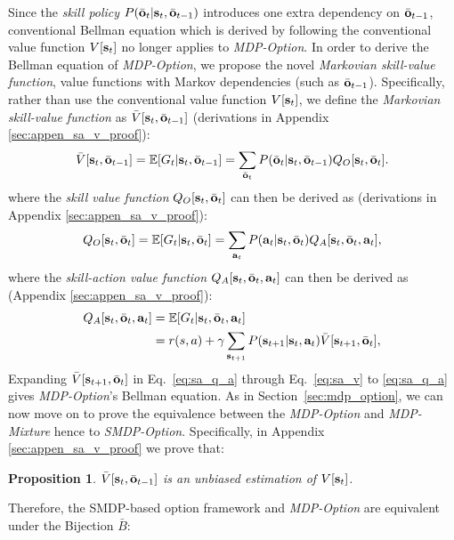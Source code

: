 \documentclass{article}
\newtheorem{prop}[thm]{Proposition}
\begin{document}
Since the \emph{skill policy}
$P(\bar{{\mathbf{o}}}_t|{\mathbf{s}}_t,\bar{{\mathbf{o}}}_{t-1})$ introduces one extra
dependency on $\bar{{\mathbf{o}}}_{t-1}$, conventional Bellman equation
which is derived by following the conventional value function
$V[{\mathbf{s}}_t]$ no longer applies to \emph{MDP-Option}. In order to derive
the Bellman equation of \emph{MDP-Option}, we propose the novel
\emph{Markovian skill-value function}, value functions with Markov
dependencies (such as $\bar{{\mathbf{o}}}_{t-1}$). Specifically, rather
than use the conventional value function $V[{\mathbf{s}}_t]$, we define
the \emph{Markovian skill-value function} as
$\bar{V}[{\mathbf{s}}_t,\bar{{\mathbf{o}}}_{t-1}]$ (derivations in Appendix
\ref{sec:appen_sa_v_proof}):
\begin{equation}
  \label{eq:sa_v}
  \bar{V}[{\mathbf{s}}_t,\bar{{\mathbf{o}}}_{t-1}]=\mathbb{E}[G_t|{\mathbf{s}}_t,\bar{{\mathbf{o}}}_{t-1}]= \sum_{\bar{{\mathbf{o}}}_t}P(\bar{{\mathbf{o}}}_t|{\mathbf{s}}_t,\bar{{\mathbf{o}}}_{t-1})Q_O[ {\mathbf{s}}_t,\bar{{\mathbf{o}}}_t].
\end{equation}
where the \emph{skill value function}
$Q_O[{\mathbf{s}}_t,\bar{{\mathbf{o}}}_{t}]$ can then be derived as (derivations
in Appendix \ref{sec:appen_sa_v_proof}):
\begin{align}
  Q_O[{\mathbf{s}}_t,\bar{{\mathbf{o}}}_{t}]=\mathbb{E}[G_t|{\mathbf{s}}_t,\bar{{\mathbf{o}}}_{t}]
  \label{eq:sa_q_o}=\sum_{{\mathbf{a}}_t}P({\mathbf{a}}_t|{\mathbf{s}}_t,\bar{{\mathbf{o}}}_{t})Q_A[ {\mathbf{s}}_t,\bar{{\mathbf{o}}}_t,{\mathbf{a}}_t],
\end{align}
where the \emph{skill-action value function} $Q_A[
{\mathbf{s}}_t,\bar{{\mathbf{o}}}_t,{\mathbf{a}}_t]$ can then be derived as (Appendix
\ref{sec:appen_sa_v_proof}):
\begin{align}
\label{eq:sa_q_a}
  Q_A[ {\mathbf{s}}_t,\bar{{\mathbf{o}}}_t,{\mathbf{a}}_t]&=\mathbb{E}[G_t| {\mathbf{s}}_t,\bar{{\mathbf{o}}}_t,{\mathbf{a}}_t]\nonumber\\
                                  &= r(s,a) + \gamma\sum_{{\mathbf{s}}_{t+1}}P({\mathbf{s}}_{t+1}|{\mathbf{s}}_t,{\mathbf{a}}_t)\bar{V}[{\mathbf{s}}_{t+1},\bar{{\mathbf{o}}}_t],
\end{align}
Expanding $\bar{V}[{\mathbf{s}}_{t+1},\bar{{\mathbf{o}}}_t]$ in
Eq.~\ref{eq:sa_q_a} through Eq.~\ref{eq:sa_v} to \ref{eq:sa_q_a}
gives \emph{MDP-Option}'s Bellman equation. As in
Section~\ref{sec:mdp_option}, we can now move on to prove the
equivalence between the \emph{MDP-Option} and \emph{MDP-Mixture}
hence to \emph{SMDP-Option}. Specifically, in Appendix
\ref{sec:appen_sa_v_proof} we prove that:
\begin{prop}
  \label{prop:var_unb}
  $\bar{V}[{\mathbf{s}}_t,\bar{{\mathbf{o}}}_{t-1} ]$ is an unbiased estimation
  of $V[ {\mathbf{s}}_t ]$.
\end{prop}
Therefore, the SMDP-based option framework and \emph{MDP-Option} are
equivalent under the Bijection $\bar{B}$:
\end{document}
